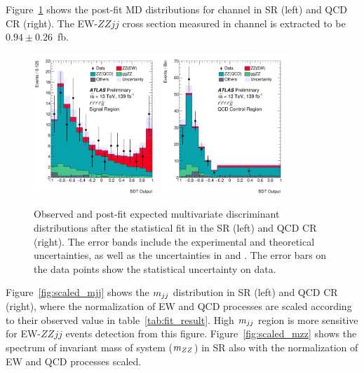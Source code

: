 Figure~\ref{fig:fit_MD} shows the post-fit MD distributions for \llll channel in SR (left) and QCD CR (right).
The EW-$ZZjj$ cross section measured in \llll channel is extracted to be $0.94 \pm 0.26$~fb.
\begin{figure}[!htbp]
\begin{center}
\includegraphics[width=0.42\textwidth]{figures/VBSZZ/fit/BDT_4l_SR_postFit.pdf}
\includegraphics[width=0.42\textwidth]{figures/VBSZZ/fit/BDT_4l_QCD_CR_postFit.pdf}
\end{center}
\caption{Observed and post-fit expected multivariate discriminant distributions after the statistical fit in the \llll SR (left) and QCD CR (right).
        The error bands include the experimental and theoretical uncertainties,
        as well as the uncertainties in \muEW and \muQCD.
        The error bars on the data points show the statistical uncertainty on data.
        }
\label{fig:fit_MD}
\end{figure}

Figure~\ref{fig:scaled_mjj} shows the $m_{jj}$ distribution in SR (left) and QCD CR (right),
where the normalization of EW and QCD processes are scaled according to their observed value in table~\ref{tab:fit_result}.
High $m_{jj}$ region is more sensitive for EW-$ZZjj$ events detection from this figure.
Figure~\ref{fig:scaled_mzz} shows the spectrum of invariant mass of \llll system ($m_{ZZ}$) in SR
also with the normalization of EW and QCD processes scaled.

